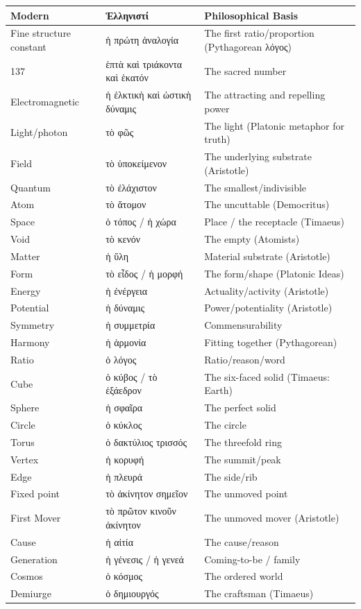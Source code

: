 \documentclass[12pt,a4paper]{article}
\newcommand{\gk}[1]{\textgreek{#1}}
\begin{document}
\begin{center}
\begin{tabular}{lp{4cm}p{6cm}}
\textbf{Modern} & \textbf{\gk{Ἑλληνιστί}} & \textbf{Philosophical Basis} \\
\hline
Fine structure constant & \gk{ἡ πρώτη ἀναλογία} & The first ratio/proportion (Pythagorean \gk{λόγος}) \\
137 & \gk{ἑπτὰ καὶ τριάκοντα καὶ ἑκατόν} & The sacred number \\
Electromagnetic & \gk{ἡ ἑλκτικὴ καὶ ὠστικὴ δύναμις} & The attracting and repelling power \\
Light/photon & \gk{τὸ φῶς} & The light (Platonic metaphor for truth) \\
Field & \gk{τὸ ὑποκείμενον} & The underlying substrate (Aristotle) \\
Quantum & \gk{τὸ ἐλάχιστον} & The smallest/indivisible \\
Atom & \gk{τὸ ἄτομον} & The uncuttable (Democritus) \\
Space & \gk{ὁ τόπος / ἡ χώρα} & Place / the receptacle (Timaeus) \\
Void & \gk{τὸ κενόν} & The empty (Atomists) \\
Matter & \gk{ἡ ὕλη} & Material substrate (Aristotle) \\
Form & \gk{τὸ εἶδος / ἡ μορφή} & The form/shape (Platonic Ideas) \\
Energy & \gk{ἡ ἐνέργεια} & Actuality/activity (Aristotle) \\
Potential & \gk{ἡ δύναμις} & Power/potentiality (Aristotle) \\
Symmetry & \gk{ἡ συμμετρία} & Commensurability \\
Harmony & \gk{ἡ ἁρμονία} & Fitting together (Pythagorean) \\
Ratio & \gk{ὁ λόγος} & Ratio/reason/word \\
Cube & \gk{ὁ κύβος / τὸ ἑξάεδρον} & The six-faced solid (Timaeus: Earth) \\
Sphere & \gk{ἡ σφαῖρα} & The perfect solid \\
Circle & \gk{ὁ κύκλος} & The circle \\
Torus & \gk{ὁ δακτύλιος τρισσός} & The threefold ring \\
Vertex & \gk{ἡ κορυφή} & The summit/peak \\
Edge & \gk{ἡ πλευρά} & The side/rib \\
Fixed point & \gk{τὸ ἀκίνητον σημεῖον} & The unmoved point \\
First Mover & \gk{τὸ πρῶτον κινοῦν ἀκίνητον} & The unmoved mover (Aristotle) \\
Cause & \gk{ἡ αἰτία} & The cause/reason \\
Generation & \gk{ἡ γένεσις / ἡ γενεά} & Coming-to-be / family \\
Cosmos & \gk{ὁ κόσμος} & The ordered world \\
Demiurge & \gk{ὁ δημιουργός} & The craftsman (Timaeus) \\
\end{tabular}
\end{center}
\end{document}

